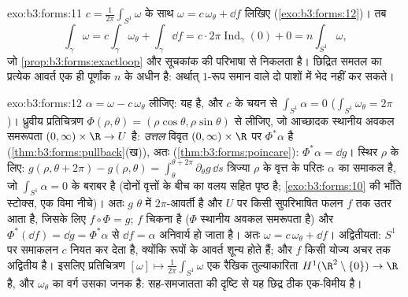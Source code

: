 \begin{solution}{exo:b3:forms:11}
$c = \frac1{2\pi}\int_{S^1}\omega$ के साथ $\omega =
c\,\omega_\theta + \dd f$ लिखिए
(\cref{exo:b3:forms:12})। तब
\[
\int_\gamma\omega = c\int_\gamma\omega_\theta +
\int_\gamma\dd f
= c\cdot2\pi\operatorname{Ind}_\gamma(0) + 0
= n\int_{S^1}\omega,
\]
जो \cref{prop:b3:forms:exactloop} और सूचकांक की परिभाषा से
निकलता है। छिद्रित समतल का प्रत्येक आवर्त एक ही पूर्णांक $n$
के अधीन है: अर्थात्  $1$-रूप समान  वाले दो
पाशों में भेद नहीं कर सकते।
\end{solution}

\begin{solution}{exo:b3:forms:12}
$\alpha = \omega - c\,\omega_\theta$ लीजिए: यह  है, और
$c$ के चयन से $\int_{S^1}\alpha = 0$
($\int_{S^1}\omega_\theta = 2\pi$)। ध्रुवीय प्रतिचित्रण
$\Phi(\rho, \theta) = (\rho\cos\theta, \rho\sin\theta)$ से
 लीजिए, जो आच्छादक स्थानीय अवकल समरूपता $(0,
\infty)\times\R \to U$ है: \emph{उत्तल} विवृत
$(0,\infty)\times\R$ पर $\Phi^*\alpha$  है
(\cref{thm:b3:forms:pullback}(ख)), अतः 
(\cref{thm:b3:forms:poincare}): $\Phi^*\alpha = \dd g$।
स्थिर $\rho$ के लिए: $g(\rho, \theta + 2\pi) - g(\rho,
\theta) = \int_\theta^{\theta + 2\pi}\partial_\theta g\,\dd s$
त्रिज्या $\rho$ के वृत्त के परितः $\alpha$ का समाकल है, जो
$\int_{S^1}\alpha = 0$ के बराबर है (दोनों वृत्तों के बीच का
वलय  सहित  पृष्ठ है; \cref{exo:b3:forms:10} की
भाँति स्टोक्स, एक विमा नीचे)। अतः $g$ $\theta$ में
$2\pi$-आवर्ती है और $U$ पर किसी सुपरिभाषित फलन $f$ तक उतर
आता है, जिसके लिए $f\circ\Phi = g$; $f$ चिकना है ($\Phi$
स्थानीय अवकल समरूपता है) और $\Phi^*(\dd f) = \dd g =
\Phi^*\alpha$ से $\dd f = \alpha$ अनिवार्य हो जाता है। अतः
$\omega = c\,\omega_\theta + \dd f$।
अद्वितीयता: $S^1$ पर समाकलन $c$ नियत कर देता है, क्योंकि
 रूपों के आवर्त शून्य होते हैं; और $f$ किसी योज्य अचर
तक अद्वितीय है। इसलिए प्रतिचित्रण $[\omega] \mapsto
\frac1{2\pi}\int_{S^1}\omega$ एक रैखिक तुल्याकारिता
$H^1(\R^2\setminus\{0\}) \to \R$ है, और $\omega_\theta$ का
वर्ग उसका जनक है: सह-समजातता की दृष्टि से यह छिद्र ठीक
एक-विमीय है।
\end{solution}

